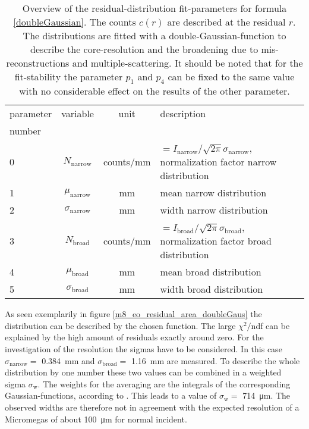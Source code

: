 \documentclass[
twoside,            %
BCOR1.4cm,          %
10pt,               %
headings=normal,    %
headsepline,        %
clearplainpage,		%
final,              %
div=14,
open=right,
bibliography=toc
]{scrreprt}
\begin{document}
\begin{table}[!h]
				
	\begin{tabular}{lccl}
		\hline
		\hline
		parameter & variable & unit & description
		\\
		number &  &  &  
		\\
		\hline
		0 & $N_{\mathrm{narrow}}$ & counts/mm & $ = I_{\mathrm{narrow}}/\sqrt{2\pi} \sigma_{\mathrm{narrow}}$, normalization factor narrow distribution
		\\
		1 & $\mu_{\mathrm{narrow}}$ & mm & mean narrow distribution
		\\
		2 & $\sigma_{\mathrm{narrow}}$ & mm & width narrow distribution
		\\
		3 & $N_{\mathrm{broad}}$ & counts/mm & $ = I_{\mathrm{broad}}/\sqrt{2\pi} \sigma_{\mathrm{broad}}$, normalization factor broad distribution
		\\
		4 & $\mu_{\mathrm{broad}}$ & mm & mean broad distribution
		\\
		5 & $\sigma_{\mathrm{broad}}$ & mm & width broad distribution
		\\
		\hline
		\hline
	\end{tabular}
	\vspace{-2mm}
	\caption{
		Overview of the residual-distribution fit-parameters for formula \ref{doubleGaussian}.
		The counts $c(r)$ are described at the residual $r$.
		The distributions are fitted with a double-Gaussian-function to describe the core-resolution and the broadening due to mis-reconstructions and multiple-scattering.
		It should be noted that for the fit-stability the parameter $p_{1}$ and $p_{4}$ can be fixed to the same value with no considerable effect on the results of the other parameter.
	}
\end{table}

As seen exemplarily in figure \ref{m8_eo_residual_area_doubleGaus} the distribution can be described by the chosen function.
The large $\chi^2/$ndf can be explained by the high amount of residuals exactly around zero.
For the investigation of the resolution the sigmas have to be considered.
In this case $\sigma_{\mathrm{narrow}} = $ \SI{0.384}{mm} and $\sigma_{\mathrm{broad}} = $ \SI{1.16}{mm} are measured.
To describe the whole distribution by one number these two values can be combined in a weighted sigma $\sigma_{\mathrm{w}}$.
The weights for the averaging are the integrals of the corresponding Gaussian-functions, according to \cite{INSTRpaper}.
This leads to a value of $\sigma_{\mathrm{w}} = $ \SI{714}{\micro m}.
The observed widths are therefore not in agreement with the expected resolution of a Micromegas of about \SI{100}{\micro m} for normal incident.
\end{document}
